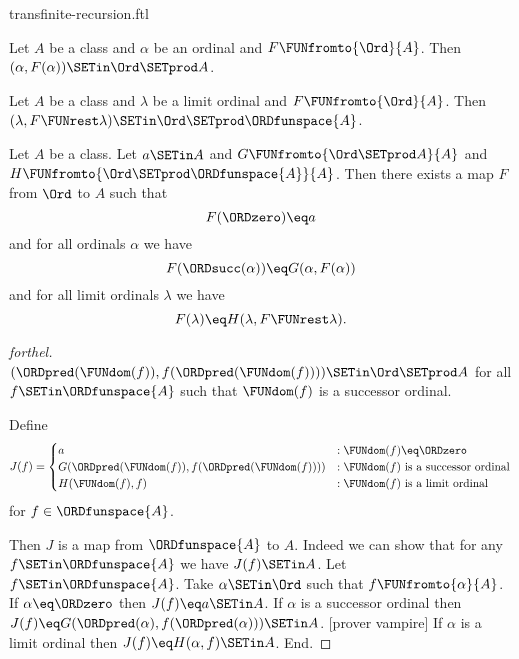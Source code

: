 \documentclass{article}
\begin{document}
\begin{smodule}{transfinite-recursion.ftl}
\begin{lemma}[forthel,id=transfinite_recursion_029348573987483]
  Let $A$ be a class and $\alpha$ be an ordinal and $F \FUNfromto{\Ord}{A}$.
  Then $(\alpha, F(\alpha)) \SETin \Ord \SETprod A$.
\end{lemma}

\begin{lemma}[forthel,id=transfinite_recursion_570293857449281]
  Let $A$ be a class and $\lambda$ be a limit ordinal and $F \FUNfromto{\Ord}{A}$.
  Then $(\lambda, F \FUNrest \lambda) \SETin \Ord \SETprod \ORDfunspace{A}$.
\end{lemma}

\begin{corollary}[forthel,id=transfinite_recursion_298647309184593]
  Let $A$ be a class.
  Let $a \SETin A$ and $G \FUNfromto{\Ord \SETprod A}{A}$ and $H \FUNfromto{\Ord \SETprod \ORDfunspace{A}}{A}$.
  Then there exists a map $F$ from $\Ord$ to $A$ such that
  \[ F(\ORDzero) \eq a \]
  and for all ordinals $\alpha$ we have
  \[ F(\ORDsucc(\alpha)) \eq G(\alpha, F(\alpha)) \]
  and for all limit ordinals $\lambda$ we have
  \[ F(\lambda) \eq H(\lambda, F \FUNrest \lambda). \]
\end{corollary}
\begin{proof}[forthel]
  $(\ORDpred(\FUNdom(f)), f(\ORDpred(\FUNdom(f)))) \SETin \Ord \SETprod A$ for all $f \SETin \ORDfunspace{A}$ such that $\FUNdom(f)$ is a successor ordinal.

  Define  \[ J(f) =
    \begin{cases}
      a
      & : \FUNdom(f) \eq \ORDzero
      \\
      G(\ORDpred(\FUNdom(f)), f(\ORDpred(\FUNdom(f))))
      & : \text{$\FUNdom(f)$ is a successor ordinal}
      \\
      H(\FUNdom(f), f)
      & : \text{$\FUNdom(f)$ is a limit ordinal}
    \end{cases} \]
  for $f \in \ORDfunspace{A}$.

  Then $J$ is a map from $\ORDfunspace{A}$ to $A$.
  Indeed we can show that for any $f \SETin \ORDfunspace{A}$ we have $J(f) \SETin A$.
    Let $f \SETin \ORDfunspace{A}$.
    Take $\alpha \SETin \Ord$ such that $f \FUNfromto{\alpha}{A}$.
    If $\alpha \eq \ORDzero$ then $J(f) \eq a \SETin A$.
    If $\alpha$ is a successor ordinal then $J(f) \eq
    G(\ORDpred(\alpha), f(\ORDpred(\alpha))) \SETin A$.
    [prover vampire]
    If $\alpha$ is a limit ordinal then $J(f) \eq H(\alpha, f) \SETin A$.
  End.


\end{proof}
\end{smodule}
\end{document}

